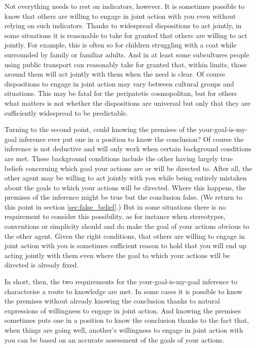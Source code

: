 \documentclass[12pt,a4paper]{extarticle}
\begin{document}
Not everything needs to rest on indicators, however.
It is sometimes possible to know that others are willing to engage in joint action with you even without relying on such indicators.  
Thanks to widespread dispositions to act jointly, in some situations it is reasonable to take for granted that others are willing to act jointly.  
For example, this is often so for children struggling with a coat while surrounded by family or familiar adults.  
And in at least some subcultures people using public transport can reasonably take for granted that, within limits, those around them will act jointly with them when the need is clear.
Of course dispositions to engage in joint action may vary between cultural groups and situations.
This may be fatal for the peripatetic cosmopolitan,
but for others what matters is not whether the dispositions are universal but only that they are sufficiently widespread to be predictable.

Turning to the second point,
could knowing the premises of the your-goal-is-my-goal inference ever put one in a position to know the conclusion?  
Of course the inference is not deductive and will only work when certain background conditions are met.  
These background conditions include the other having largely true beliefs concerning which goal your actions are or will be directed to.
After all, the other agent may be willing to act jointly with you while being entirely mistaken about the goals to which your actions will be directed.
Where this happens, the premises of the inference might be true but the conclusion false.
(We return to this point in section \vref{sec:false_belief}.)  
But in some situations there is no requirement  to consider  this possibility, as for instance when stereotypes, conventions or simplicity should and do make the goal of your actions obvious to the other agent.
Given the right conditions,
that others are willing to engage in joint action with you 
is sometimes sufficient reason to hold that
you will end up acting jointly with them
 even where the goal to which your actions will be directed is already fixed.

In short, then, the two requirements for the your-goal-is-my-goal inference to characterise a route to knowledge are met.  
In some cases it is possible to know the premises without already knowing the conclusion thanks to natural expressions of willingness to engage in joint action.  
And knowing the premises sometimes puts one in a position to know the conclusion thanks to the fact that, when things are going well, another's willingness to engage in joint action with you can be based on an accurate assessment of the goals of your actions.
\end{document}
